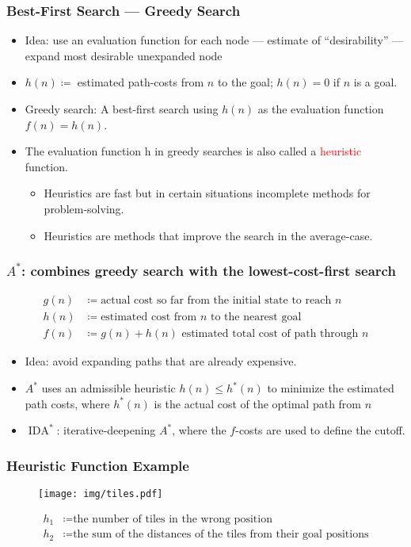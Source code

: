 \documentclass[UTF8,11pt,colorlinks,compress,openany]{beamer}%
\begin{document}
\begin{frame}\frametitle{Best-First Search --- Greedy Search}
\begin{itemize}
	\item Idea: use an evaluation function for each node --- estimate of ``desirability'' --- expand most desirable unexpanded node
	\item $h(n)\coloneqq$ estimated path-costs from $n$ to the goal; $h(n)=0$ if $n$ is a goal.
	\item Greedy search: A best-first search using $h(n)$ as the evaluation function $f(n)=h(n)$.
	\item The evaluation function h in greedy searches is also called a \textcolor{red}{heuristic} function.
	\begin{itemize}
		\item Heuristics are fast but in certain situations incomplete methods for problem-solving.
		\item Heuristics are methods that improve the search in the average-case.
	\end{itemize}
\end{itemize}
\end{frame}

\begin{frame}\frametitle{$A^*$: combines greedy search with the lowest-cost-first search}
\begin{align*}
	g(n)&\coloneqq \mbox{actual cost so far from the initial state to reach } n\\
	h(n)&\coloneqq \mbox{estimated cost from $n$ to the nearest goal}\\
	f(n)&\coloneqq g(n)+h(n) \mbox{ estimated total cost of path through } n
\end{align*}
\begin{itemize}
	\item Idea: avoid expanding paths that are already expensive.
	\item $A^*$ uses an admissible heuristic $h(n)\leq h^*(n)$ to minimize the estimated path costs, where $h^*(n)$ is the actual cost of the optimal path from $n$
	\item $\operatorname{IDA}^*$: iterative-deepening $A^*$, where the $f$-costs are used to define the cutoff.
\end{itemize}
\end{frame}

\begin{frame}\frametitle{Heuristic Function Example}
\begin{figure}[H]
	\texttt{[image: img/tiles.pdf]}
\end{figure}
\begin{align*}
	h_1&\coloneqq\mbox{the number of tiles in the wrong position}\\
	h_2&\coloneqq\mbox{the sum of the distances of the tiles from their goal positions}
\end{align*}
\end{frame}
\end{document}

